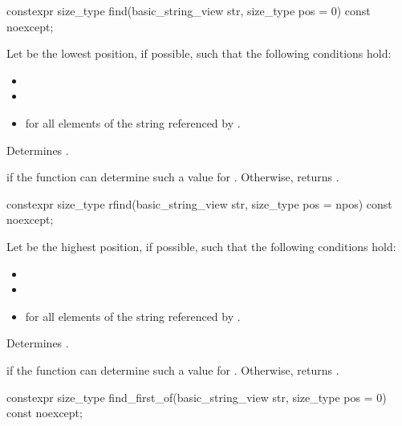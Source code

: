 %
\begin{itemdecl}
constexpr size_type find(basic_string_view str, size_type pos = 0) const noexcept;
\end{itemdecl}

\begin{itemdescr}
\pnum
Let  be the lowest position, if possible, such that the following conditions hold:
\begin{itemize}
\item
{}
\item
{}
\item
{} for all elements  of the string referenced by .
\end{itemize}

\pnum
\effects
Determines .

\pnum
\returns
{} if the function can determine such a value for .
Otherwise, returns .
\end{itemdescr}

%
\begin{itemdecl}
constexpr size_type rfind(basic_string_view str, size_type pos = npos) const noexcept;
\end{itemdecl}

\begin{itemdescr}
\pnum
Let  be the highest position, if possible, such that the following conditions hold:
\begin{itemize}
\item
{}
\item
{}
\item
{} for all elements  of the string referenced by .
\end{itemize}

\pnum
\effects
Determines .

\pnum
\returns
{} if the function can determine such a value for .
Otherwise, returns .
\end{itemdescr}

%
\begin{itemdecl}
constexpr size_type find_first_of(basic_string_view str, size_type pos = 0) const noexcept;
\end{itemdecl}


